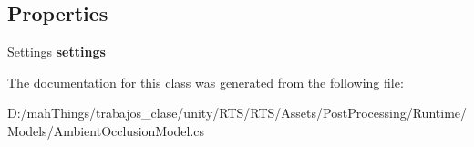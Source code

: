 \subsection*{Properties}
\begin{DoxyCompactItemize}
\item 
\mbox{\label{class_unity_engine_1_1_post_processing_1_1_ambient_occlusion_model_a6105dc68e0acd74c0b10137f664949b0}} 
\mbox{\hyperlink{struct_unity_engine_1_1_post_processing_1_1_ambient_occlusion_model_1_1_settings}{Settings}} {\bfseries settings}
\end{DoxyCompactItemize}


The documentation for this class was generated from the following file\+:\begin{DoxyCompactItemize}
\item 
D\+:/mah\+Things/trabajos\+\_\+clase/unity/\+R\+T\+S/\+R\+T\+S/\+Assets/\+Post\+Processing/\+Runtime/\+Models/Ambient\+Occlusion\+Model.\+cs\end{DoxyCompactItemize}
